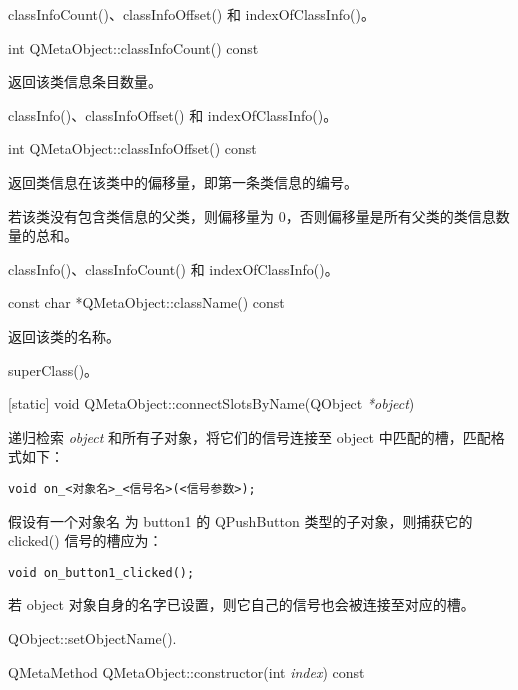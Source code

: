 
\begin{notice}[另请参阅]
classInfoCount()、classInfoOffset() 和 indexOfClassInfo()。
\end{notice}

int QMetaObject::classInfoCount() const

返回该类信息条目数量。

\begin{notice}[另请参阅]
classInfo()、classInfoOffset() 和 indexOfClassInfo()。
\end{notice}

int QMetaObject::classInfoOffset() const

返回类信息在该类中的偏移量，即第一条类信息的编号。

若该类没有包含类信息的父类，则偏移量为 0，否则偏移量是所有父类的类信息数量的总和。

\begin{notice}[另请参阅]
classInfo()、classInfoCount() 和 indexOfClassInfo()。
\end{notice}

const char *QMetaObject::className() const

返回该类的名称。

\begin{notice}[另请参阅]
superClass()。
\end{notice}

[static] void QMetaObject::connectSlotsByName(QObject \emph{*object})

递归检索 \emph{object} 和所有子对象，将它们的信号连接至 object 中匹配的槽，匹配格式如下：

\begin{lstlisting}
void on_<对象名>_<信号名>(<信号参数>);
\end{lstlisting}

假设有一个对象名 为 button1 的 QPushButton 类型的子对象，则捕获它的 clicked() 信号的槽应为：

\begin{lstlisting}
void on_button1_clicked();
\end{lstlisting}

若 object 对象自身的名字已设置，则它自己的信号也会被连接至对应的槽。

\begin{notice}[另请参阅]
QObject::setObjectName().
\end{notice}

QMetaMethod QMetaObject::constructor(int \emph{index}) const

